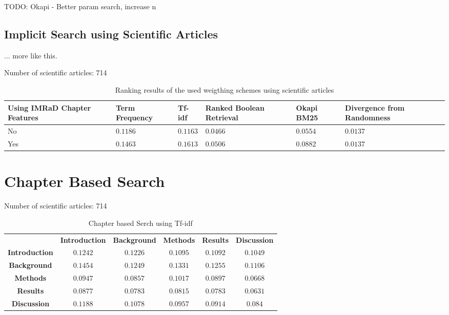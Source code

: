 TODO: Okapi - Better param search, increase n

\subsection{Implicit Search using Scientific Articles}

... more like this.

Number of scientific articles: 714

\begin{table}[b]
    \centering
    \begin{tabular}{ C{2.1cm} C{2.1cm} C{2.1cm} C{2.1cm} C{2.1cm} C{2.1cm} }
      \toprule
      \textbf{Using IMRaD Chapter Features} & \textbf{Term Frequency} & \textbf{Tf-idf} & \textbf{Ranked Boolean Retrieval} & \textbf{Okapi BM25} & \textbf{Divergence from Randomness} \\ \midrule
      No  & $0.1186$ & $0.1163$ & $0.0466$ & $0.0554$ & $0.0137$ \\
      Yes & $0.1463$ & $0.1613$ & $0.0506$ & $0.0882$ & $0.0137$ \\
      \bottomrule
    \end{tabular}
  \caption[Ranking results using scientific articles]{Ranking results of the used weigthing schemes using scientific articles}
  \label{tbl:ranking_result_full}
\end{table}


\section{Chapter Based Search}

Number of scientific articles: 714

\begin{table}[b]
  \centering
  \begin{tabular}{ c c c c c c }
    \toprule
     & \textbf{Introduction} & \textbf{Background} & \textbf{Methods} & \textbf{Results} & \textbf{Discussion} \\
    \textbf{Introduction} & $0.1242$ & $0.1226$ & $0.1095$ & $0.1092$ & $0.1049$ \\
    \textbf{Background}   & $0.1454$ & $0.1249$ & $0.1331$ & $0.1255$ & $0.1106$ \\
    \textbf{Methods}      & $0.0947$ & $0.0857$ & $0.1017$ & $0.0897$ & $0.0668$ \\
    \textbf{Results}      & $0.0877$ & $0.0783$ & $0.0815$ & $0.0783$ & $0.0631$ \\
    \textbf{Discussion}   & $0.1188$ & $0.1078$ & $0.0957$ & $0.0914$ & $0.084$  \\
    \bottomrule
  \end{tabular}
  \caption[Chapter based Serch using Tf-idf]{Chapter based Serch using Tf-idf}
  \label{tbl:ranking_result_full}
\end{table}

